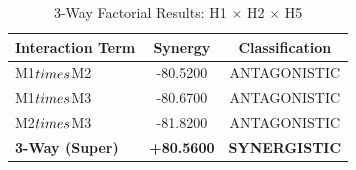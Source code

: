 
\begin{table}[h]
\centering
\caption{3-Way Factorial Results: H1 × H2 × H5}
\label{tab:3way_results}
\begin{tabular}{lcc}
\hline
Interaction Term & Synergy & Classification \\
\hline
M1$\\times$M2 & -80.5200 & ANTAGONISTIC \\
M1$\\times$M3 & -80.6700 & ANTAGONISTIC \\
M2$\\times$M3 & -81.8200 & ANTAGONISTIC \\
\textbf{3-Way (Super)} & \textbf{+80.5600} & \textbf{SYNERGISTIC} \\
\hline
\end{tabular}
\end{table}
